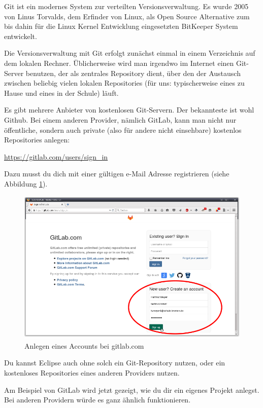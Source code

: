 Git ist ein modernes System zur verteilten Versionsverwaltung. Es wurde 2005 von
Linus Torvalds, dem Erfinder von Linux, als Open Source Alternative zum bis
dahin für die Linux Kernel Entwicklung eingesetzten BitKeeper System entwickelt.

Die Versionsverwaltung mit Git erfolgt zunächst einmal in einem Verzeichnis auf
dem lokalen Rechner. Üblicherweise wird man irgendwo im Internet einen
Git-Server benutzen, der als zentrales Repository dient, über den der Austausch
zwischen beliebig vielen lokalen Repositories (für uns: typischerweise eines zu
Hause und eines in der Schule) läuft.

Es gibt mehrere Anbieter von kostenlosen Git-Servern. Der bekannteste ist
wohl Github. Bei einem anderen Provider, nämlich GitLab, kann man nicht nur
öffentliche, sondern auch private (also für andere nicht einsehbare) kostenlos Repositories
anlegen:

\url{https://gitlab.com/users/sign_in}

Dazu musst du dich mit einer gültigen e-Mail Adresse registrieren (siehe
Abbildung \ref{fig:gitlab-account-creation}).

\begin{figure}[h]
  \centering
   \includegraphics[width=1.0\textwidth]{./inf/SEKII/01_Vorbereitung/GitLab_Account_Creation.png}
   \caption{Anlegen eines Accounts bei gitlab.com}
   \label{fig:gitlab-account-creation}
\end{figure}

Du kannst Eclipse auch ohne solch ein Git-Repository nutzen, oder ein
kostenloses Repositories eines anderen Providers nutzen.

Am Beispiel von GitLab wird jetzt gezeigt, wie du dir ein eigenes Projekt
anlegst. Bei anderen Providern würde es ganz ähnlich funktionieren.

